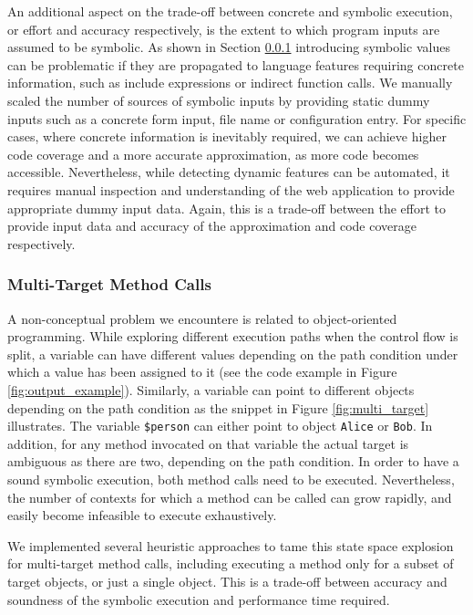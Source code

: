 \documentclass[sigconf]{acmart}
\renewcommand{\tt}[1]{\texttt{#1}}
\begin{document}
An additional aspect on the trade-off between concrete and symbolic execution,
or effort and accuracy respectively, is the extent to which program inputs are
assumed to be symbolic. As shown in Section \ref{} introducing symbolic values
can be problematic if they are propagated to language features requiring
concrete information, such as include expressions or indirect function calls.
We manually scaled the number of sources of symbolic inputs by providing static
dummy inputs such as a concrete form input, file name or configuration entry.
For specific cases, where concrete information is inevitably required, we can
achieve higher code coverage and a more accurate approximation, as more code
becomes accessible. Nevertheless, while detecting dynamic features can be
automated, it requires manual inspection and understanding of the web
application to provide appropriate dummy input data. Again, this is a trade-off
between the effort to provide input data and accuracy of the approximation and
code coverage respectively.

\subsubsection{Multi-Target Method Calls}
A non-conceptual problem we encountere is related to object-oriented programming. While exploring
different execution paths when the control flow is split, a variable can have
different values depending on the path condition under which a value has been
assigned to it (see the code example in Figure \ref{fig:output_example}).
Similarly, a variable can point to different objects depending on the path
condition as the snippet in Figure \ref{fig:multi_target} illustrates. The variable \tt{\$person} can either
point to object \tt{Alice} or \tt{Bob}. In addition, for any method invocated on
that variable the actual target is ambiguous as there are two, depending on the
path condition. In order to have a sound symbolic execution, both method calls
need to be executed. Nevertheless, the number of contexts for which a method can
be called can grow rapidly, and easily become infeasible to execute
exhaustively.

We implemented several heuristic approaches to tame this state space explosion
for multi-target method calls, including executing a method only for a subset of
target objects, or just a single object. This is a trade-off between accuracy
and soundness of the symbolic execution and performance time required.
\end{document}

